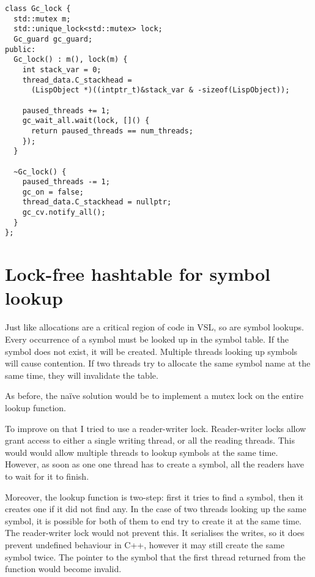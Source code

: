 \begin{verbatim}
class Gc_lock {
  std::mutex m;
  std::unique_lock<std::mutex> lock;
  Gc_guard gc_guard;
public:
  Gc_lock() : m(), lock(m) {
    int stack_var = 0;
    thread_data.C_stackhead =
      (LispObject *)((intptr_t)&stack_var & -sizeof(LispObject));

    paused_threads += 1;
    gc_wait_all.wait(lock, []() {
      return paused_threads == num_threads;
    });
  }

  ~Gc_lock() {
    paused_threads -= 1;
    gc_on = false;
    thread_data.C_stackhead = nullptr;
    gc_cv.notify_all();
  }
};
\end{verbatim}


\section{Lock-free hashtable for symbol lookup}
\label{sec:hashtable}
Just like allocations are a critical region of code in VSL, so are symbol lookups.
Every occurrence of a symbol must be looked up in the symbol table. If the symbol does
not exist, it will be created. Multiple threads looking up symbols will cause contention.
If two threads try to allocate the same symbol name at the same time, they will invalidate
the table.

As before, the na\"ive solution would be to implement a mutex lock on the entire
lookup function.

To improve on that I tried to use a reader-writer lock. Reader-writer locks allow grant access
to either a single writing thread, or all the reading threads. This would would allow multiple
threads to lookup symbols at the same time. However, as soon as one one thread has to create a
symbol, all the readers have to wait for it to finish.

Moreover, the lookup function is two-step: first it tries to find a symbol, then it creates one
if it did not find any. In the case of two threads looking up the same symbol, it is possible for
both of them to end try to create it at the same time. The reader-writer lock would not prevent this.
It serialises the writes, so it does prevent undefined behaviour in C++, however it may
still create the same symbol twice. The pointer to the symbol that the first thread returned from the function
would become invalid.


